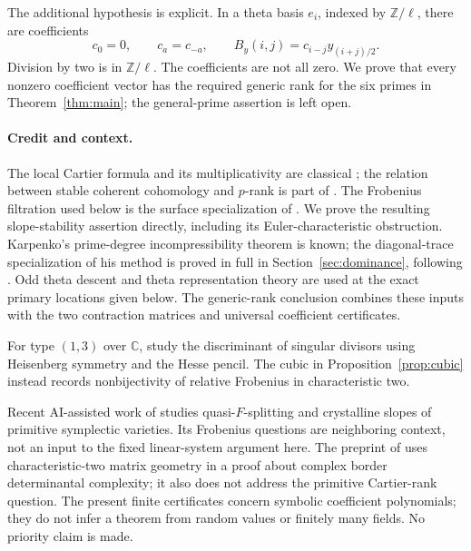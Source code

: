 \documentclass[11pt]{article}
\theoremstyle{definition}\newtheorem{definition}[theorem]{Definition}
\theoremstyle{remark}\newtheorem{remark}[theorem]{Remark}
\begin{document}
The additional hypothesis is explicit. In a theta basis $e_i$, indexed by $\mathbb Z/\ell$, there are coefficients
\[
 c_0=0,\qquad c_a=c_{-a},\qquad
 B_y(i,j)=c_{i-j}y_{(i+j)/2}.
\]
Division by two is in $\mathbb Z/\ell$. The coefficients are not all zero. We prove that every nonzero coefficient vector has the required generic rank for the six primes in Theorem~\ref{thm:main}; the general-prime assertion is left open.

\paragraph{Credit and context.}
The local Cartier formula and its multiplicativity are classical \citep[0, (2.1.4)--(2.1.13), pp.~514--515]{Illusie}; the relation between stable coherent cohomology and $p$-rank is part of \citet[Propositions~3.18 and 3.22--3.24, pp.~89, 99--101]{Oda}. The Frobenius filtration used below is the surface specialization of \citet[Definition~3.1, Lemmas~3.2--3.5 and Theorem~3.6, pp.~5--9]{Sun}. We prove the resulting slope-stability assertion directly, including its Euler-characteristic obstruction. Karpenko's prime-degree incompressibility theorem is known; the diagonal-trace specialization of his method is proved in full in Section~\ref{sec:dominance}, following \citet[Lemmas~2.21, 2.23 and Corollaries~2.22, 2.24, pp.~9--10]{Karpenko}. Odd theta descent and theta representation theory are used at the exact primary locations given below. The generic-rank conclusion combines these inputs with the two contraction matrices and universal coefficient certificates.

For type $(1,3)$ over $\mathbb C$, \citet[Introduction, Theorems~0.1--0.2, pp.~1--2]{CataneseSernesi} study the discriminant of singular divisors using Heisenberg symmetry and the Hesse pencil. The cubic in Proposition~\ref{prop:cubic} instead records nonbijectivity of relative Frobenius in characteristic two.

Recent AI-assisted work of \citet[Introduction, Theorems~A--C, and acknowledgements]{Zou} studies quasi-$F$-splitting and crystalline slopes of primitive symplectic varieties. Its Frobenius questions are neighboring context, not an input to the fixed linear-system argument here. The preprint of \citet[Introduction and Theorem~1.1, pp.~2--5]{OpenAI} uses characteristic-two matrix geometry in a proof about complex border determinantal complexity; it also does not address the primitive Cartier-rank question. The present finite certificates concern symbolic coefficient polynomials; they do not infer a theorem from random values or finitely many fields. No priority claim is made.
\end{document}
